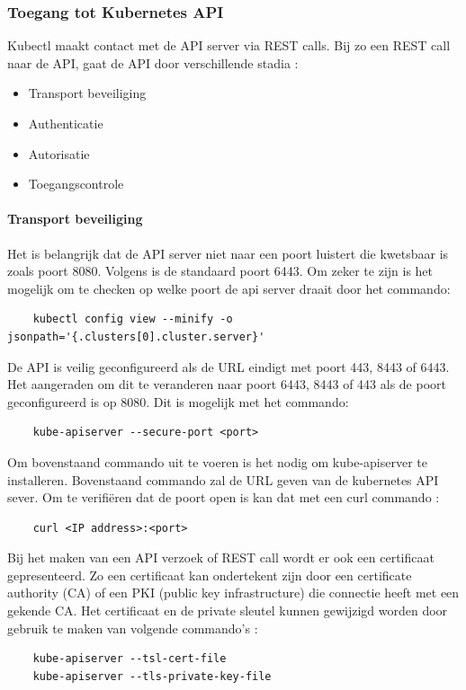 \subsubsection{Toegang tot Kubernetes API}
Kubectl maakt contact met de API server via REST calls. Bij zo een REST call naar de API, gaat de API door verschillende stadia \autocite{KubernetesDocs-2023}: 
\begin{itemize}
    \item Transport beveiliging
    \item Authenticatie
    \item Autorisatie
    \item Toegangscontrole
\end{itemize}
\paragraph{Transport beveiliging}
Het is belangrijk dat de API server niet naar een poort luistert die kwetsbaar is zoals poort 8080. Volgens \autocite{KubernetesDocs-2023} is de standaard poort 6443. Om zeker te zijn is het mogelijk om te checken op welke poort de api server draait door het commando:
\begin{verbatim}
    kubectl config view --minify -o jsonpath='{.clusters[0].cluster.server}'
\end{verbatim}

De API is veilig geconfigureerd als de URL eindigt met poort 443, 8443 of 6443. Het aangeraden om dit te veranderen naar poort 6443, 8443 of 443 als de poort geconfigureerd is op 8080. Dit is mogelijk met het commando:
\begin{verbatim}
    kube-apiserver --secure-port <port>
\end{verbatim}

Om bovenstaand commando uit te voeren is het nodig om kube-apiserver te installeren. 
Bovenstaand commando zal de URL geven van de kubernetes API sever. Om te verifiëren dat de poort open is kan dat met een curl commando \autocite{Rice2018}:
\begin{verbatim}
    curl <IP address>:<port>
\end{verbatim}

Bij het maken van een API verzoek of REST call wordt er ook een certificaat gepresenteerd. Zo een certificaat kan ondertekent zijn door een certificate authority (CA) of een PKI (public key infrastructure) die connectie heeft met een gekende CA. Het certificaat en de private sleutel kunnen gewijzigd worden door gebruik te maken van volgende commando's \autocite{KubernetesDocs-2023}:
\begin{verbatim}
    kube-apiserver --tsl-cert-file
    kube-apiserver --tls-private-key-file
\end{verbatim}

